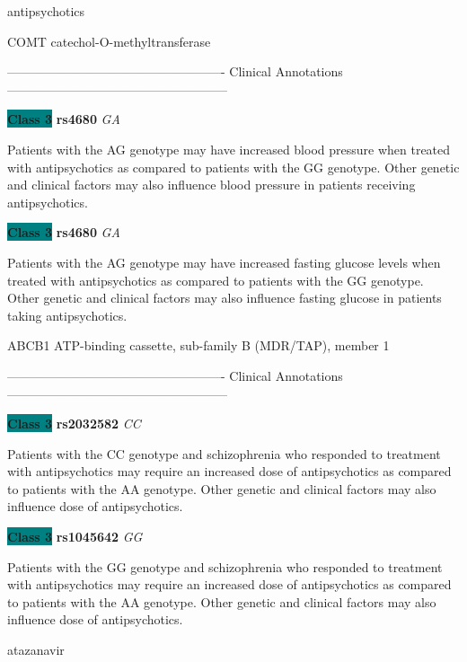 \documentclass{resume} %
\begin{document}
\begin{rSection}{ antipsychotics }
\begin{rSubsection}{ COMT }{ catechol-O-methyltransferase }{}{}
\item[] ---------------------------------------------------- Clinical Annotations -----------------------------------------------------\newline
\item \textbf{\colorbox{teal} {Class 3}} \textbf{ rs4680 } \textit{ GA }
\item[] Patients with the AG genotype may have increased blood pressure when treated with antipsychotics as compared to patients with the GG genotype. Other genetic and clinical factors may also influence blood pressure in patients receiving antipsychotics.\item \textbf{\colorbox{teal} {Class 3}} \textbf{ rs4680 } \textit{ GA }
\item[] Patients with the AG genotype may have increased fasting glucose levels when treated with antipsychotics as compared to patients with the GG genotype. Other genetic and clinical factors may also influence fasting glucose in patients taking antipsychotics.
\end{rSubsection}\begin{rSubsection}{ ABCB1 }{ ATP-binding cassette, sub-family B (MDR/TAP), member 1 }{}{}
\item[]

\item[] ---------------------------------------------------- Clinical Annotations -----------------------------------------------------\newline
\item \textbf{\colorbox{teal} {Class 3}} \textbf{ rs2032582 } \textit{ CC }
\item[] Patients with the CC genotype and schizophrenia who responded to treatment with antipsychotics may require an increased dose of antipsychotics as compared to patients with the AA genotype. Other genetic and clinical factors may also influence dose of antipsychotics.\item \textbf{\colorbox{teal} {Class 3}} \textbf{ rs1045642 } \textit{ GG }
\item[] Patients with the GG genotype and schizophrenia who responded to treatment with antipsychotics may require an increased dose of antipsychotics as compared to patients with the AA genotype. Other genetic and clinical factors may also influence dose of antipsychotics. 
\end{rSubsection}

\end{rSection}\begin{rSection}{ atazanavir }
\item[]


\end{rSection}
\end{document}
